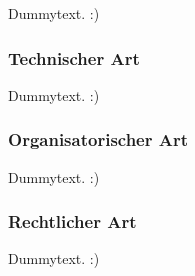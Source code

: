 Dummytext. :)


\subsubsection*{Technischer Art}
\label{subsubsec:gefahren_virt_technisch}
Dummytext. :)

\subsubsection*{Organisatorischer Art}
\label{subsubsec:gefahren_virt_organisatorisch}
Dummytext. :)

\subsubsection*{Rechtlicher Art}
\label{subsubsec:gefahren_virt_rechtlich}
Dummytext. :)
